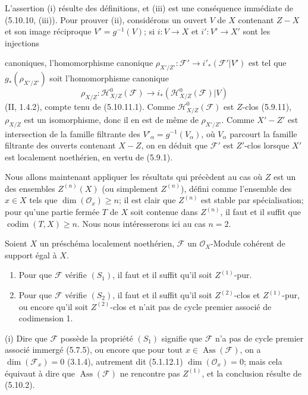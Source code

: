 L'assertion (i) résulte des définitions, et (iii) est une conséquence immédiate
de (5.10.10, (iii)). Pour prouver (ii), considérons un ouvert $V$ de $X$
contenant $Z-X$ et son image réciproque $V'=g^{-1}(V)$; si $i:V\to X$ et
$i':V'\to X'$ sont les injections


canoniques, l'homomorphisme canonique
$\rho_{X'/Z'}:\mathcal F'\to i'_*(\mathcal F'|V')$ est tel que
$g_*(\rho_{X'/Z'})$ soit l'homomorphisme canonique
\[
\rho_{X/Z}:\mathcal H^0_{X/Z}(\mathcal F)
\longrightarrow i_*(\mathcal H^0_{X/Z}(\mathcal F)|V)
\]
(II, 1.4.2), compte tenu de (5.10.11.1). Comme
$\mathcal H^0_{X/Z}(\mathcal F)$ est $Z$-clos (5.9.11), $\rho_{X/Z}$ est un
isomorphisme, donc il en est de même de $\rho_{X'/Z'}$. Comme $X'-Z'$ est
intersection de la famille filtrante des $V'_\alpha=g^{-1}(V_\alpha)$, où
$V_\alpha$ parcourt la famille filtrante des ouverts contenant $X-Z$, on en
déduit que $\mathcal F'$ est $Z'$-clos lorsque $X'$ est localement noethérien,
en vertu de (5.9.1).

\begin{env}[5.10.13]
\label{IV.2.s5.10.13-fr}
Nous allons maintenant appliquer les résultats qui précèdent au cas où $Z$ est
un des ensembles $Z^{(n)}(X)$ (ou simplement $Z^{(n)}$), défini comme
l'ensemble des $x\in X$ tels que $\dim(\mathcal O_x)\geq n$; il est clair que
$Z^{(n)}$ est stable par spécialisation; pour qu'une partie fermée $T$ de $X$
soit contenue dans $Z^{(n)}$, il faut et il suffit que
$\operatorname{codim}(T,X)\geq n$. Nous nous intéresserons ici au cas $n=2$.
\end{env}

\begin{proposition}[5.10.14]
\label{IV.2.s5.10.14-fr}
Soient $X$ un préschéma localement noethérien, $\mathcal F$ un
$\mathcal O_X$-Module cohérent de support égal à $X$.
\begin{enumerate}
\item[(i)] Pour que $\mathcal F$ vérifie $(S_1)$, il faut et il suffit qu'il
soit $Z^{(1)}$-pur.
\item[(ii)] Pour que $\mathcal F$ vérifie $(S_2)$, il faut et il suffit qu'il
soit $Z^{(2)}$-clos et $Z^{(1)}$-pur, ou encore qu'il soit $Z^{(2)}$-clos et
n'ait pas de cycle premier associé de codimension 1.
\end{enumerate}
\end{proposition}

(i) Dire que $\mathcal F$ possède la propriété $(S_1)$ signifie que
$\mathcal F$ n'a pas de cycle premier associé immergé (5.7.5), ou encore que
pour tout $x\in\operatorname{Ass}(\mathcal F)$, on a
$\dim(\mathcal F_x)=0$ (3.1.4), autrement dit (5.1.12.1)
$\dim(\mathcal O_x)=0$; mais cela équivaut à dire que
$\operatorname{Ass}(\mathcal F)$ ne rencontre pas $Z^{(1)}$, et la conclusion
résulte de (5.10.2).

